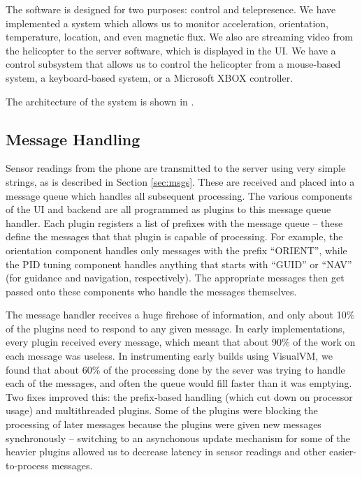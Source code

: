 \begin{landscape}
\end{landscape}

The software is designed for two purposes: control and
telepresence. We have implemented a system which allows us to monitor
acceleration, orientation, temperature, location, and even magnetic
flux. We also are streaming video from the helicopter to the server
software, which is displayed in the UI. We have a control subsystem
that allows us to control the helicopter from a mouse-based system, a
keyboard-based system, or a Microsoft XBOX controller. 

The architecture of the system is shown in .

\subsection{Message Handling}
Sensor readings from the phone are transmitted to the server using
very simple strings, as is described in Section \ref{sec:msgs}. These
are received and placed into a message queue which handles all
subsequent processing. The various components of the UI and backend
are all programmed as plugins to this message queue handler. Each
plugin registers a list of prefixes with the message queue -- these
define the messages that that plugin is capable of processing. For
example, the orientation component handles only messages with the
prefix ``ORIENT'', while the PID tuning component handles anything
that starts with ``GUID'' or ``NAV'' (for guidance and navigation,
respectively). The appropriate messages then get passed onto these
components who handle the messages themselves.

The message handler receives a huge firehose of information, and only
about 10\% of the plugins need to respond to any given message. In
early implementations, every plugin received every message, which
meant that about 90\% of the work on each message was useless. In
instrumenting early builds using VisualVM, we found that about 60\% of
the processing done by the sever was trying to handle each of the
messages, and often the queue would fill faster than it was
emptying. Two fixes improved this: the prefix-based handling (which
cut down on processor usage) and multithreaded plugins. Some of the
plugins were blocking the processing of later messages because the
plugins were given new messages synchronously -- switching to an
asynchonous update mechanism for some of the heavier plugins allowed
us to decrease latency in sensor readings and other easier-to-process
messages.

